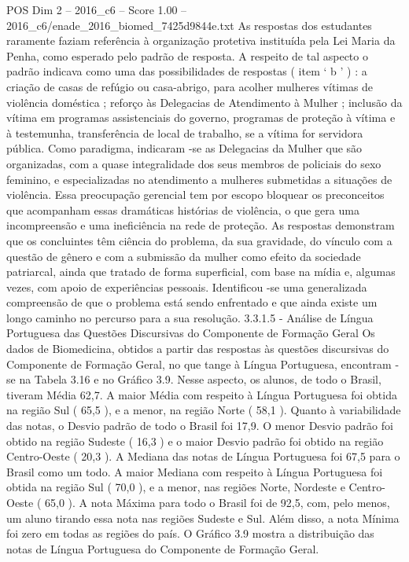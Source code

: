 \begin{textsample}{POS Dim 2 – 2016\_c6 – Score 1.00 – 2016\_c6/enade\_2016\_biomed\_7425d9844e.txt}
As respostas dos estudantes raramente faziam referência à organização protetiva instituída pela Lei Maria da Penha, como esperado pelo padrão de resposta.
A respeito de tal aspecto o padrão indicava como uma das possibilidades de respostas ( item ‘ b ’ ) : a criação de casas de refúgio ou casa-abrigo, para acolher mulheres vítimas de violência doméstica ; reforço às Delegacias de Atendimento à Mulher ; inclusão da vítima em programas assistenciais do governo, programas de proteção à vítima e à testemunha, transferência de local de trabalho, se a vítima for servidora pública.
Como paradigma, indicaram -se as Delegacias da Mulher que são organizadas, com a quase integralidade dos seus membros de policiais do sexo feminino, e especializadas no atendimento a mulheres submetidas a situações de violência.
Essa preocupação gerencial tem por escopo bloquear os preconceitos que acompanham essas dramáticas histórias de violência, o que gera uma incompreensão e uma ineficiência na rede de proteção.
As respostas demonstram que os concluintes têm ciência do problema, da sua gravidade, do vínculo com a questão de gênero e com a submissão da mulher como efeito da sociedade patriarcal, ainda que tratado de forma superficial, com base na mídia e, algumas vezes, com apoio de experiências pessoais.
Identificou -se uma generalizada compreensão de que o problema está sendo enfrentado e que ainda existe um longo caminho no percurso para a sua resolução. 3.3.1.5 - Análise de Língua Portuguesa das Questões Discursivas do Componente de Formação Geral Os dados de Biomedicina, obtidos a partir das respostas às questões discursivas do Componente de Formação Geral, no que tange à Língua Portuguesa, encontram -se na Tabela 3.16 e no Gráfico 3.9.
Nesse aspecto, os alunos, de todo o Brasil, tiveram Média 62,7.
A maior Média com respeito à Língua Portuguesa foi obtida na região Sul ( 65,5 ), e a menor, na região Norte ( 58,1 ).
Quanto à variabilidade das notas, o Desvio padrão de todo o Brasil foi 17,9.
O menor Desvio padrão foi obtido na região Sudeste ( 16,3 ) e o maior Desvio padrão foi obtido na região Centro-Oeste ( 20,3 ).
A Mediana das notas de Língua Portuguesa foi 67,5 para o Brasil como um todo.
A maior Mediana com respeito à Língua Portuguesa foi obtida na região Sul ( 70,0 ), e a menor, nas regiões Norte, Nordeste e Centro-Oeste ( 65,0 ).
A nota Máxima para todo o Brasil foi de 92,5, com, pelo menos, um aluno tirando essa nota nas regiões Sudeste e Sul.
Além disso, a nota Mínima foi zero em todas as regiões do país.
O Gráfico 3.9 mostra a distribuição das notas de Língua Portuguesa do Componente de Formação Geral.

\end{textsample}
